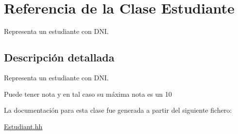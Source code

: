 \hypertarget{class_estudiante}{}\section{Referencia de la Clase Estudiante}
\label{class_estudiante}


Representa un estudiante con D\+NI.  




\subsection{Descripción detallada}
Representa un estudiante con D\+NI. 

Puede tener nota y en tal caso su máxima nota es un 10 

La documentación para esta clase fue generada a partir del siguiente fichero\+:\begin{DoxyCompactItemize}
\item 
\hyperlink{_estudiant_8hh}{Estudiant.\+hh}\end{DoxyCompactItemize}
